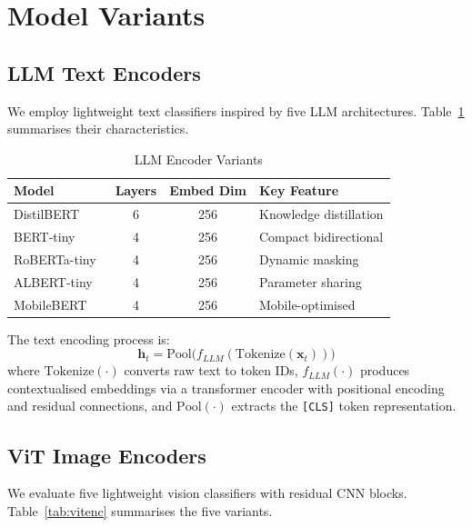 \documentclass[12pt, a4paper, oneside]{Thesis}
\begin{document}
\section{Model Variants}

\subsection{LLM Text Encoders}

We employ lightweight text classifiers inspired by five LLM architectures.
Table~\ref{tab:llmenc} summarises their characteristics.

\begin{table}[t]
\caption{LLM Encoder Variants}
\label{tab:llmenc}
\centering\footnotesize
\begin{tabular}{lccl}
\toprule
\textbf{Model} & \textbf{Layers} & \textbf{Embed Dim} & \textbf{Key Feature}\\
\midrule
DistilBERT~\cite{Sanh2019}    & 6 & 256 & Knowledge distillation \\
BERT-tiny~\cite{Devlin2019}     & 4 & 256 & Compact bidirectional \\
RoBERTa-tiny~\cite{Liu2019}  & 4 & 256 & Dynamic masking \\
ALBERT-tiny~\cite{Lan2020}   & 4 & 256 & Parameter sharing \\
MobileBERT~\cite{Sun2020}    & 4 & 256 & Mobile-optimised \\
\bottomrule
\end{tabular}
\end{table}

The text encoding process is:
\begin{equation}
  \mathbf{h}_t = \mathrm{Pool}\!\bigl(f_{LLM}(\mathrm{Tokenize}(\mathbf{x}_t))\bigr)
  \label{eq:textenc}
\end{equation}
where $\mathrm{Tokenize}(\cdot)$ converts raw text to token IDs, $f_{LLM}(\cdot)$
produces contextualised embeddings via a transformer encoder with positional encoding
and residual connections, and $\mathrm{Pool}(\cdot)$ extracts the \texttt{[CLS]} token
representation.

\subsection{ViT Image Encoders}

We evaluate five lightweight vision classifiers with residual CNN blocks.
Table~\ref{tab:vitenc} summarises the five variants.
\end{document}
